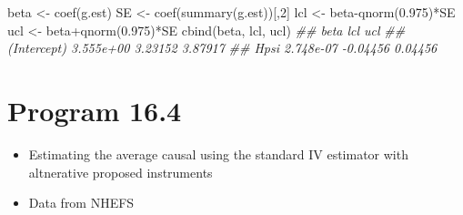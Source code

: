 \documentclass[
  10pt,
  a4paper,
]{book}
\newenvironment{Shaded}{\begin{snugshade}}{\end{snugshade}}
\newcommand{\DecValTok}[1]{\textcolor[rgb]{0.68,0.00,0.00}{#1}}
\newcommand{\DocumentationTok}[1]{\textcolor[rgb]{0.37,0.37,0.37}{\textit{#1}}}
\newcommand{\FloatTok}[1]{\textcolor[rgb]{0.68,0.00,0.00}{#1}}
\newcommand{\FunctionTok}[1]{\textcolor[rgb]{0.28,0.35,0.67}{#1}}
\newcommand{\NormalTok}[1]{\textcolor[rgb]{0.00,0.46,0.62}{#1}}
\newcommand{\OtherTok}[1]{\textcolor[rgb]{0.00,0.46,0.62}{#1}}
\newcommand{\SpecialCharTok}[1]{\textcolor[rgb]{0.37,0.37,0.37}{#1}}
\providecommand{\tightlist}{%
  \setlength{\itemsep}{0pt}\setlength{\parskip}{0pt}}
\begin{document}
\begin{Shaded}
\begin{Highlighting}[]
\NormalTok{beta }\OtherTok{\textless{}{-}} \FunctionTok{coef}\NormalTok{(g.est)}
\NormalTok{SE }\OtherTok{\textless{}{-}} \FunctionTok{coef}\NormalTok{(}\FunctionTok{summary}\NormalTok{(g.est))[,}\DecValTok{2}\NormalTok{]}
\NormalTok{lcl }\OtherTok{\textless{}{-}}\NormalTok{ beta}\SpecialCharTok{{-}}\FunctionTok{qnorm}\NormalTok{(}\FloatTok{0.975}\NormalTok{)}\SpecialCharTok{*}\NormalTok{SE }
\NormalTok{ucl }\OtherTok{\textless{}{-}}\NormalTok{ beta}\SpecialCharTok{+}\FunctionTok{qnorm}\NormalTok{(}\FloatTok{0.975}\NormalTok{)}\SpecialCharTok{*}\NormalTok{SE}
\FunctionTok{cbind}\NormalTok{(beta, lcl, ucl)}
\DocumentationTok{\#\#                  beta      lcl     ucl}
\DocumentationTok{\#\# (Intercept) 3.555e+00  3.23152 3.87917}
\DocumentationTok{\#\# Hpsi        2.748e{-}07 {-}0.04456 0.04456}
\end{Highlighting}
\end{Shaded}

\section{Program 16.4}\label{program-16.4}

\begin{itemize}
\tightlist
\item
  Estimating the average causal using the standard IV estimator with altnerative proposed instruments
\item
  Data from NHEFS
\end{itemize}
\end{document}
